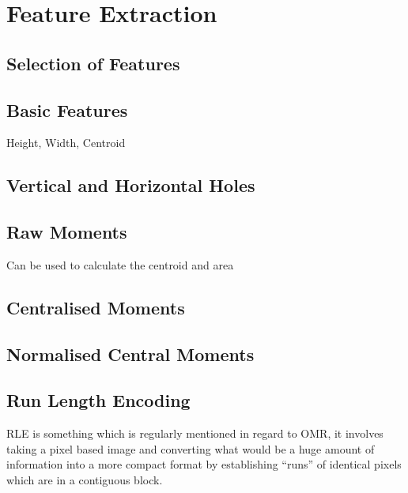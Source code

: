 \section{Feature Extraction}

\subsection{Selection of Features}

\subsection{Basic Features}
Height, Width, Centroid

\subsection{Vertical and Horizontal Holes}

\subsection{Raw Moments}

Can be used to calculate the centroid and area

\subsection{Centralised Moments}


\subsection{Normalised Central Moments}

\subsection{Run Length Encoding}
\label{sec:tb-rle}

\acrfull{RLE} is something which is regularly mentioned in regard to OMR, it involves taking a pixel based image and converting what would be a huge amount of information into a more compact format by establishing ``runs'' of identical pixels which are in a contiguous block.

